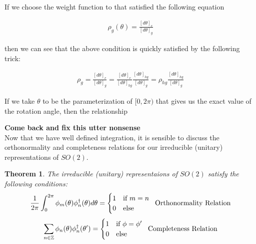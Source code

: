 \documentclass[10pt]{ucthesis}
\newcommand{\Z}{\mathbb{Z}}
\newtheorem{theorem}[definition]{Theorem}
\begin{document}
If we choose the weight function to that satisfied the following equation

\begin{equation}
	\begin{aligned}
		\rho_{g}(\theta) = \frac{[d\theta]_e}{[d\theta]_g}
	\end{aligned}
\end{equation}
 
then we can see that the above condition is quickly satisfied by the following trick:


\begin{equation}
	\begin{aligned}
		\rho_g =  \frac{[d\theta]_e}{[d\theta]_g} =  \frac{[d\theta]_e}{[d\theta]_{hg}}\frac{[d\theta]_{hg}}{[d\theta]_g} = \rho_{hg}\frac{[d\theta]_{hg}}{[d\theta]_g}
	\end{aligned}
\end{equation}

If we take $\theta$ to be the parameterization of $[0,2\pi)$ that gives us the exact value of the rotation angle, then the relationship 

\textbf{Come back and fix this utter nonsense}\\

Now that we have well defined integration, it is sensible to discuss the orthonormality and completeness relations for our irreducible (unitary) representations of $SO(2)$.

\begin{theorem}
	The irreducible (unitary) representaions of $SO(2)$ satisfy the following conditions:
\begin{equation}
	\begin{aligned}
		\frac{1}{2\pi} \int_0^{2\pi} \phi_m(\theta) \phi_n^\dag(\theta) d\theta= \begin{cases}
																			1 & \text{if } m=n \\
																			0 & \text{else}
																		\end{cases}\hspace{2mm} \text{Orthonormality Relation}
	\end{aligned}
\end{equation}
\begin{equation}
	\begin{aligned}
		\sum_{n\in\Z} \phi_n(\theta) \phi_n^\dag(\theta') = \begin{cases}
																			1 & \text{if } \phi=\phi' \\
																			0 & \text{else}
																		\end{cases} \hspace{2mm} \text{Completeness Relation}
	\end{aligned}
\end{equation}
\end{theorem}
\end{document}
